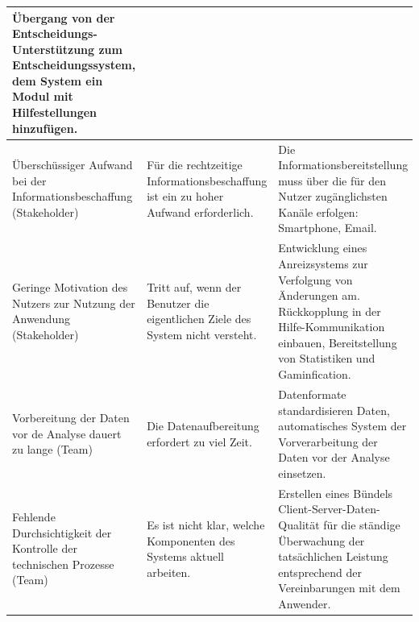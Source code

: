 \documentclass[11pt,a4paper]{article}
\begin{document}
\begin{center}
\begin{tabular}{|p{}|p{}|p{}|}
    Übergang von der Entscheidungs-Unterstützung zum Entscheidungssystem, dem
    System ein Modul mit Hilfestellungen hinzufügen.\\\hline

    Überschüssiger Aufwand bei der Informationsbeschaffung (Stakeholder) &

    Für die rechtzeitige Informationsbeschaffung ist ein zu hoher Aufwand
    erforderlich. &

    Die Informationsbereitstellung muss über die für den Nutzer zugänglichsten
    Kanäle erfolgen: Smartphone, Email.\\\hline

    Geringe Motivation des Nutzers zur Nutzung der Anwendung (Stakeholder) &

    Tritt auf, wenn der Benutzer die eigentlichen Ziele des System nicht
    versteht. &

    Entwicklung eines Anreizsystems zur Verfolgung von Änderungen am.
    Rückkopplung in der Hilfe-Kommunikation einbauen, Bereitstellung von
    Statistiken und Gaminfication.\\\hline

    Vorbereitung der Daten vor de Analyse dauert zu lange (Team) &
    
    Die Datenaufbereitung erfordert zu viel Zeit. &

    Datenformate standardisieren Daten, automatisches System der
    Vorverarbeitung der Daten vor der Analyse einsetzen.\\\hline

    Fehlende Durchsichtigkeit der Kontrolle der technischen Prozesse (Team) &
    
    Es ist nicht klar, welche Komponenten des Systems aktuell arbeiten. &

    Erstellen eines Bündels Client-Server-Daten-Qualität für die ständige
    Überwachung der tatsächlichen Leistung entsprechend der Vereinbarungen mit
    dem Anwender.\\\hline
  \end{tabular}
\end{center}
\end{document}
